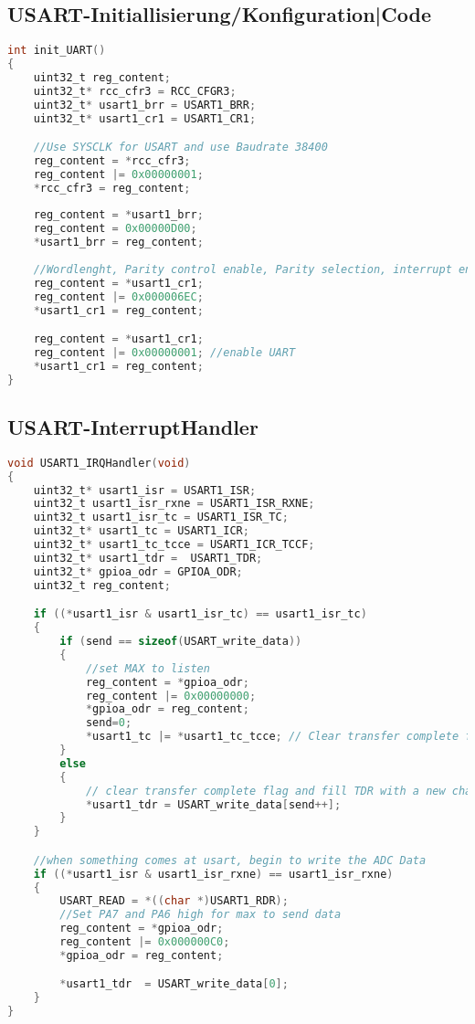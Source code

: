     \subsection{USART-Initiallisierung/Konfiguration|Code}
        \begin{lstlisting}[language=C, style=CStyle, caption=Init-UART, captionpos=b, label=Init-UART]
int init_UART()
{   
    uint32_t reg_content;
    uint32_t* rcc_cfr3 = RCC_CFGR3;
    uint32_t* usart1_brr = USART1_BRR;
    uint32_t* usart1_cr1 = USART1_CR1;

    //Use SYSCLK for USART and use Baudrate 38400
    reg_content = *rcc_cfr3;                
    reg_content |= 0x00000001;
    *rcc_cfr3 = reg_content; 
    
    reg_content = *usart1_brr;
    reg_content = 0x00000D00;
    *usart1_brr = reg_content;
    
    //Wordlenght, Parity control enable, Parity selection, interrupt enable, Transmission complete interrupt enable, RXNE interrupt enable
    reg_content = *usart1_cr1;
    reg_content |= 0x000006EC;
    *usart1_cr1 = reg_content;

    reg_content = *usart1_cr1;
    reg_content |= 0x00000001; //enable UART
    *usart1_cr1 = reg_content;
}
        \end{lstlisting}
        
    \subsection{USART-InterruptHandler}
    \begin{lstlisting}[language=C, style=CStyle, caption=Init-UART, captionpos=b, label=Init-UART]
void USART1_IRQHandler(void)
{   
    uint32_t* usart1_isr = USART1_ISR;
    uint32_t usart1_isr_rxne = USART1_ISR_RXNE;
    uint32_t usart1_isr_tc = USART1_ISR_TC;
    uint32_t* usart1_tc = USART1_ICR;
    uint32_t* usart1_tc_tcce = USART1_ICR_TCCF;
    uint32_t* usart1_tdr =  USART1_TDR;
    uint32_t* gpioa_odr = GPIOA_ODR;
    uint32_t reg_content;

    if ((*usart1_isr & usart1_isr_tc) == usart1_isr_tc)
    {
        if (send == sizeof(USART_write_data)) 
        {
            //set MAX to listen 
            reg_content = *gpioa_odr;
            reg_content |= 0x00000000;
            *gpioa_odr = reg_content;          
            send=0;
            *usart1_tc |= *usart1_tc_tcce; // Clear transfer complete flag *      
        }
        else
        {
            // clear transfer complete flag and fill TDR with a new char 
            *usart1_tdr = USART_write_data[send++];
        }
    }

    //when something comes at usart, begin to write the ADC Data 
    if ((*usart1_isr & usart1_isr_rxne) == usart1_isr_rxne)
    {
        USART_READ = *((char *)USART1_RDR);
        //Set PA7 and PA6 high for max to send data
        reg_content = *gpioa_odr;
        reg_content |= 0x000000C0;
        *gpioa_odr = reg_content;

        *usart1_tdr  = USART_write_data[0];
    }
}
    \end{lstlisting}
                

    
   
